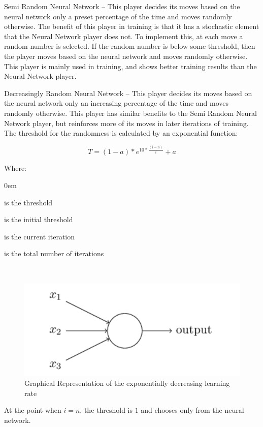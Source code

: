 \documentclass{sig-alternate-05-2015}
\begin{document}
Semi Random Neural Network -- This player decides its moves based on the neural network only a preset percentage of the time and moves randomly otherwise. The benefit of this player in training is that it has a stochastic element that the Neural Network player does not. To implement this, at each move a random number is selected. If the random number is below some threshold, then the player moves based on the neural network and moves randomly otherwise. This player is mainly used in training, and shows better training results than the Neural Network player.

Decreasingly Random Neural Network -- This player decides its moves based on the neural network only an increasing percentage of the time and moves randomly otherwise. This player has similar benefits to the Semi Random Neural Network player, but reinforces more of its moves in later iterations of training. The threshold for the randomness is calculated by an exponential function:

\begin{equation}
T = (1-a) * e^{10 * \frac{(i-n)}{i} }+ a
\end{equation}

Where:
\begin{description}
\itemsep0em 
\item [t] is the threshold 
\item [a] is the initial threshold
\item [i] is the current iteration
\item [n] is the total number of iterations
\end{description} 
\

\begin{figure}[h!]
  \includegraphics[width=\linewidth]{neuron.png}
  \caption{Graphical Representation of the exponentially decreasing learning rate}
  \label{fig:neuron4}
\end{figure}


At the point when $i = n$, the threshold is $1$ and chooses only from the neural network.
\end{document}
